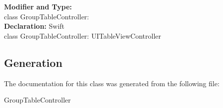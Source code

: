 \textbf{Modifier and Type:}\\
\tab class GroupTableController:\\


\textbf{Declaration:}
\tab 
Swift\\

class GroupTableController: UITableViewController\\


\subsection{Generation}
The documentation for this class was generated from the following file\-:
\begin{DoxyCompactItemize}
\item GroupTableController
\end{DoxyCompactItemize} 









